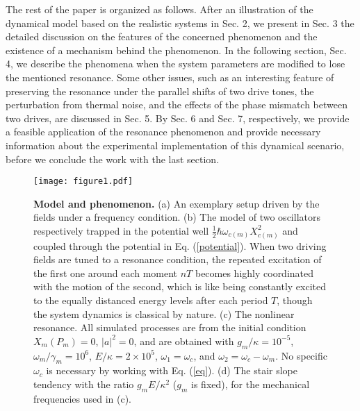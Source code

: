 \documentclass[a4paper,fleqn]{cas-dc}
\begin{document}
The rest of the paper is organized as follows. After an illustration of the dynamical model based on the realistic systems in Sec. 2, 
we present in Sec. 3 the detailed discussion on the features of the concerned phenomenon and the existence of a mechanism behind the phenomenon. In the following section, Sec. 4, we describe the phenomena when the system parameters are modified to lose the mentioned resonance. Some other issues, such as an interesting feature of preserving the resonance under the parallel shifts of two drive tones, the perturbation from thermal noise, and the effects of the phase mismatch between two drives, are discussed in Sec. 5. By Sec. 6 and Sec. 7, respectively, we provide a feasible application of the resonance phenomenon and provide necessary information about the experimental implementation of this dynamical scenario, before we conclude the work with the last section.

\begin{figure}
	\centering
		\texttt{[image: figure1.pdf]}
	\caption{{\bf Model and phenomenon.} (a) An exemplary setup driven by the fields under a frequency condition. 
(b) The model of two oscillators respectively trapped in the potential well $\frac{1}{2}\hbar\omega_{c(m)}X^2_{c(m)}$ and coupled through the potential in Eq. (\ref{potential}). 
When two driving fields are tuned to a resonance condition, the repeated excitation of the first one around each moment $nT$ becomes highly coordinated with the motion of the second, which is like being constantly excited to the equally distanced energy levels after each period $T$, though the system dynamics is classical by nature. (c) The nonlinear resonance. All simulated processes are from the initial condition $X_m (P_m)=0$, $|a|^2=0$, and are obtained with $g_m/\kappa=10^{-5}$, $\omega_m/\gamma_m=10^6$, $E/\kappa=2\times 10^5$, $\omega_1=\omega_c$, and $\omega_2=\omega_c-\omega_m$. No specific $\omega_c$ is necessary by working with 
Eq. (\ref{eq}). (d) The stair slope tendency with the ratio $g_mE/\kappa^2$ ($g_m$ is fixed), for the mechanical frequencies used in (c).}
	\label{FIG:1}
 \vspace{-0.3cm}
\end{figure}
\end{document}
